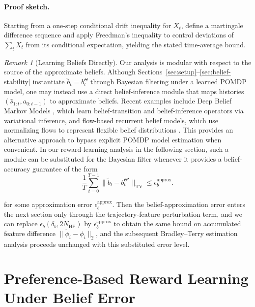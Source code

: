 \documentclass[10pt]{article} %
\theoremstyle{plain}
\theoremstyle{definition}
\theoremstyle{remark}
\newtheorem{remark}[theorem]{Remark}
\begin{document}
\paragraph{Proof sketch.}
Starting from a one-step conditional drift inequality for $X_t$, define a martingale difference sequence and apply Freedman’s inequality to control deviations of $\sum_t X_t$ from its conditional expectation, yielding the stated time-average bound.

\medskip

\begin{remark}[Learning Beliefs Directly]\label{rem:alternative-belief-approx}
Our analysis is modular with respect to the source of the approximate beliefs. 
Although Sections~\ref{sec:setup}--\ref{sec:belief-stability} instantiate $\tilde b_t=b_t^\Theta$ through Bayesian filtering under a learned POMDP model, one may instead use a direct belief-inference module that maps histories $(\hat s_{1:t},a_{0:t-1})$ to approximate beliefs. Recent examples include Deep Belief Markov Models \cite{DBeliefNN}, which learn belief-transition and belief-inference operators via variational inference, and flow-based recurrent belief models, which use normalizing flows to represent flexible belief distributions \citep{flowBelief}. This provides an alternative approach to bypass explicit POMDP model estimation when convenient. In our reward-learning analysis in the following section, such a module can be substituted for the Bayesian filter whenever it provides a belief-accuracy guarantee of the form
\[
\frac1T\sum_{t=0}^{T-1}\|\tilde b_t-b_t^{\Theta^\star}\|_{\mathrm{TV}}\le \epsilon_b^{\mathrm{approx}} .
\]
 
for some approximation error $\epsilon_b^{\mathrm{approx}}$. Then the belief-approximation error enters the next section only through the trajectory-feature perturbation term, and we can replace
$\epsilon_b(\delta_b,2N_{\mathrm{HF}})$ by $\epsilon_b^{\mathrm{approx}}$
to obtain the same bound on accumulated feature difference $\|\tilde\phi_i-\phi_i\|_2$, and the subsequent Bradley--Terry estimation analysis proceeds unchanged with this substituted error level.
\end{remark}


\section{Preference-Based Reward Learning Under Belief Error}
\label{sec:rlhf}
\end{document}
